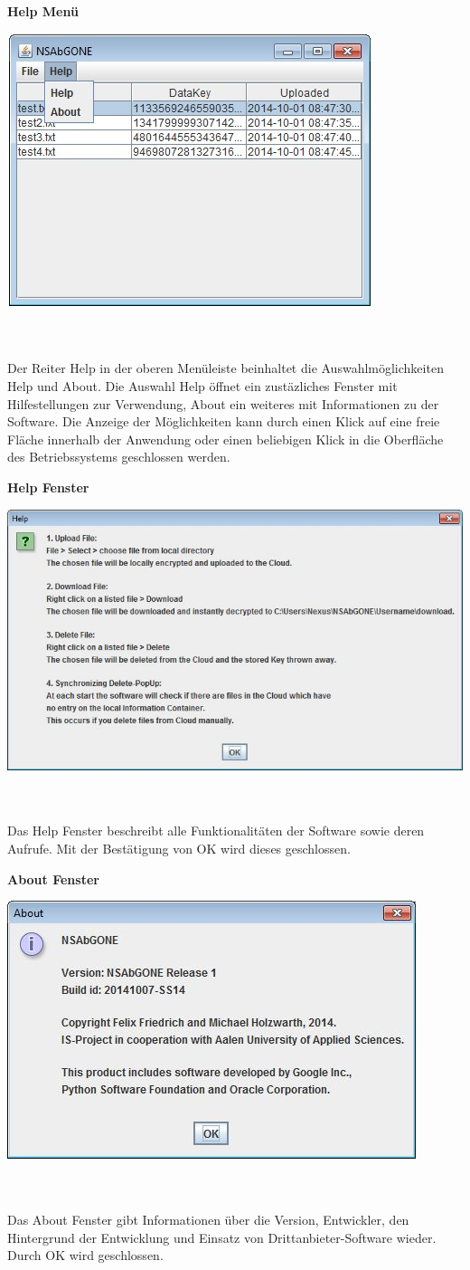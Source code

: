 \documentclass[12pt,a4paper,bibliography=totocnumbered,listof=totocnumbered]{scrartcl}
\begin{document}
\textbf{Help Menü}
\vspace{1em}
$\;$\\
\begin{minipage}{\linewidth}
	\centering
	\includegraphics[width=0.4\linewidth]{Help.jpg}
	\label{Help}
\end{minipage}
\\\\Der Reiter Help in der oberen Menüleiste beinhaltet die Auswahlmöglichkeiten Help und About. Die Auswahl Help öffnet ein zustäzliches Fenster mit Hilfestellungen zur Verwendung, About ein weiteres mit Informationen zu der Software. Die Anzeige der Möglichkeiten kann durch einen Klick auf eine freie Fläche innerhalb der Anwendung oder einen beliebigen Klick in die Oberfläche des Betriebssystems geschlossen werden.

\textbf{Help Fenster}
\vspace{1em}
$\;$\\
\begin{minipage}{\linewidth}
	\centering
	\includegraphics[width=0.4\linewidth]{HelpPopUp.jpg}
	\label{HelpPopUp}
\end{minipage}
\\\\Das Help Fenster beschreibt alle Funktionalitäten der Software sowie deren Aufrufe. Mit der Bestätigung von OK wird dieses  geschlossen.

\textbf{About Fenster}
\vspace{1em}
$\;$\\
\begin{minipage}{\linewidth}
	\centering
	\includegraphics[width=0.4\linewidth]{AboutPopUp.jpg}
	\label{AboutPopUp}
\end{minipage}
\\\\Das About Fenster gibt Informationen über die Version, Entwickler, den Hintergrund der Entwicklung und Einsatz von Drittanbieter-Software wieder. Durch OK wird geschlossen.
\end{document}
